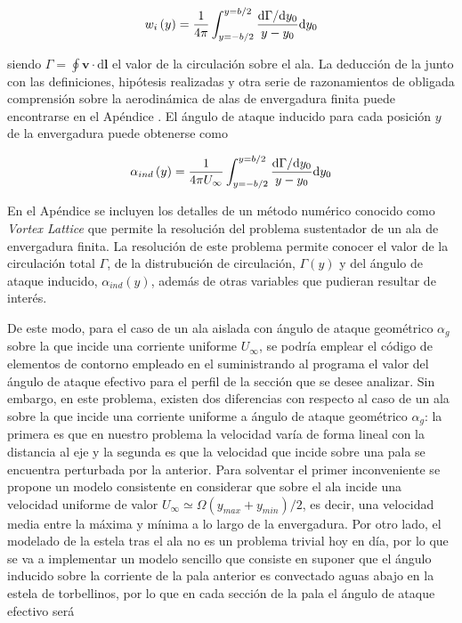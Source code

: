 \begin{equation}
w_{i}\left(y\right) = \dfrac{1}{4\pi}\int_{y=-b/2}^{y=b/2} \dfrac{\mathrm{d}\Gamma/\mathrm{d}y_{0}}{y-y_{0}}\mathrm{d}y_{0}
\LABEQ{velInducida}
\end{equation}

siendo $\Gamma = \oint \mathbf{v}\cdot \mathbf{\mathrm{d}l}$ el valor de la circulación sobre el ala. La deducción de la  junto con las definiciones, hipótesis realizadas y otra serie de razonamientos de obligada comprensión sobre la aerodinámica de alas de envergadura finita puede encontrarse en el Apéndice %
. El ángulo de ataque inducido para cada posición $y$ de la envergadura puede obtenerse como 

\begin{equation}
\alpha_{ind}\left(y\right) = \dfrac{1}{4\pi U_{\infty}}\int_{y=-b/2}^{y=b/2} \dfrac{\mathrm{d}\Gamma/\mathrm{d}y_{0}}{y-y_{0}}\mathrm{d}y_{0}
\LABEQ{alphaInd}
\end{equation}

En el Apéndice %
se incluyen los detalles de un método numérico conocido como \emph{Vortex Lattice} que permite la resolución del problema sustentador de un ala de envergadura finita. La resolución de este problema permite conocer el valor de la circulación total $\Gamma$, de la distrubución de circulación, $\Gamma\left(y\right)$ y del ángulo de ataque inducido, $\alpha_{ind}\left(y\right)$, además de otras variables que pudieran resultar de interés. 

De este modo, para el caso de un ala aislada con ángulo de ataque geométrico $\alpha_{g}$ sobre la que incide una corriente uniforme $U_{\infty}$, se podría emplear el código de elementos de contorno empleado en el  suministrando al programa el valor del ángulo de ataque efectivo para el perfil de la sección que se desee analizar. Sin embargo, en este problema, existen dos diferencias con respecto al caso de un ala sobre la que incide una corriente uniforme a ángulo de ataque geométrico $\alpha_{g}$: la primera es que en nuestro problema la velocidad varía de forma lineal con la distancia al eje y la segunda es que la velocidad que incide sobre una pala se encuentra perturbada por la anterior. Para solventar el primer inconveniente se propone un modelo consistente en considerar que sobre el ala incide una velocidad uniforme de valor $U_\infty \simeq \Omega\left(y_{max}+y_{min}\right)/2$, es decir, una velocidad media entre la máxima y mínima a lo largo de la envergadura. Por otro lado, el modelado de la estela tras el ala  no es un problema trivial hoy en día, por lo que se va a implementar un modelo sencillo que consiste en suponer que el ángulo inducido sobre la corriente de la pala anterior es convectado aguas abajo en la estela de torbellinos, por lo que en cada sección de la pala el ángulo de ataque efectivo será

